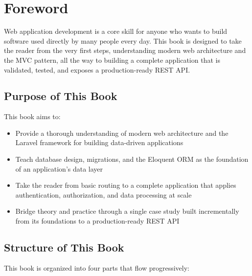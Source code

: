 
\chapter*{Foreword}

Web application development is a core skill for anyone who wants to build
software used directly by many people every day. This book is designed to
take the reader from the very first steps, understanding modern web
architecture and the MVC pattern, all the way to building a complete
application that is validated, tested, and exposes a production-ready REST
API.

\section*{Purpose of This Book}

This book aims to:

\begin{itemize}
    \item Provide a thorough understanding of modern web architecture and the
          Laravel framework for building data-driven applications
    \item Teach database design, migrations, and the Eloquent ORM as the
          foundation of an application's data layer
    \item Take the reader from basic routing to a complete application that
          applies authentication, authorization, and data processing at scale
    \item Bridge theory and practice through a single case study built
          incrementally from its foundations to a production-ready REST API
\end{itemize}

\section*{Structure of This Book}

This book is organized into four parts that flow progressively:

